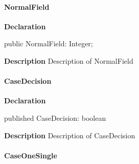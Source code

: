 \documentclass{report}
\begin{document}
\paragraph*{NormalField}\hspace*{\fill}

\begin{list}{}{
\setlength{\itemindent}{0cm}
\setlength{\listparindent}{0cm}
\setlength{\leftmargin}{\evensidemargin}
\addtolength{\leftmargin}{\tmplength}
\settowidth{\labelsep}{X}
\addtolength{\leftmargin}{\labelsep}
\setlength{\labelwidth}{\tmplength}
}
\begin{flushleft}
\item[\textbf{Declaration}\hfill]
\begin{ttfamily}
public NormalField: Integer;\end{ttfamily}


\end{flushleft}
\par
\item[\textbf{Description}]
Description of NormalField

\end{list}
\paragraph*{CaseDecision}\hspace*{\fill}

\begin{list}{}{
\setlength{\itemindent}{0cm}
\setlength{\listparindent}{0cm}
\setlength{\leftmargin}{\evensidemargin}
\addtolength{\leftmargin}{\tmplength}
\settowidth{\labelsep}{X}
\addtolength{\leftmargin}{\labelsep}
\setlength{\labelwidth}{\tmplength}
}
\begin{flushleft}
\item[\textbf{Declaration}\hfill]
\begin{ttfamily}
published CaseDecision: boolean\end{ttfamily}


\end{flushleft}
\par
\item[\textbf{Description}]
Description of CaseDecision

\end{list}
\paragraph*{CaseOneSingle}\hspace*{\fill}
\end{document}

